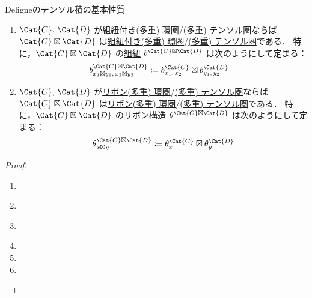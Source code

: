\documentclass[TQFT_main]{subfiles}
\begin{document}
\begin{myprop}[label=prop:DeligneProduct]{Deligneのテンソル積の基本性質}
\begin{enumerate}
            \begin{align}
                p^{\Cat{C} \boxtimes \Cat{D}}_{x \boxtimes y} \coloneqq p^{\Cat{C}}_x \boxtimes p^{\Cat{D}}_y
            \end{align}
        \item $\Cat{C},\, \Cat{D}$ が\hyperref[redef:braided-monoidal]{組紐付き}\hyperref[def:ringcat]{(多重) 環圏}/\hyperref[def:tensorfusion-cat]{(多重) テンソル圏}ならば $\Cat{C} \boxtimes \Cat{D}$ は\hyperref[redef:braided-monoidal]{組紐付き}\hyperref[def:ringcat]{(多重) 環圏}/\hyperref[def:tensorfusion-cat]{(多重) テンソル圏}である．
            特に，$\Cat{C} \boxtimes \Cat{D}$ の\hyperref[redef:braided-monoidal]{組紐} $b^{\Cat{C} \boxtimes \Cat{D}}$ は次のようにして定まる：
            \begin{align}
                b^{\Cat{C} \boxtimes \Cat{D}}_{x_1 \boxtimes y_1,\, x_2 \boxtimes y_2} 
                &\coloneqq b^{\Cat{C}}_{x_1,\, x_2} \boxtimes b^{\Cat{D}}_{y_1,\, y_2}
            \end{align}
        \item $\Cat{C},\, \Cat{D}$ が\hyperref[def:ribbon]{リボン}\hyperref[def:ringcat]{(多重) 環圏}/\hyperref[def:tensorfusion-cat]{(多重) テンソル圏}ならば $\Cat{C} \boxtimes \Cat{D}$ は\hyperref[def:ribbon]{リボン}\hyperref[def:ringcat]{(多重) 環圏}/\hyperref[def:tensorfusion-cat]{(多重) テンソル圏}である．
            特に，$\Cat{C} \boxtimes \Cat{D}$ の\hyperref[def:ribbon]{リボン構造} $\theta^{\Cat{C} \boxtimes \Cat{D}}$ は次のようにして定まる：
            \begin{align}
                \theta^{\Cat{C} \boxtimes \Cat{D}}_{x \boxtimes y} \coloneqq \theta^{\Cat{C}}_x \boxtimes \theta^{\Cat{D}}_y 
            \end{align}
    \end{enumerate}
\end{myprop}

\begin{proof}
    \begin{enumerate}
        \item ~\cite[PROPOSITION 1.11.2., p.15]{etingof2015tensor}
        \item ~\cite[PROPOSITION 1.11.2., p.15]{etingof2015tensor}
        \item ~\cite[PROPOSITION 4.6.1., p.73]{etingof2015tensor}
        \item
        \item
        \item
    \end{enumerate}
\end{proof}
\end{document}
